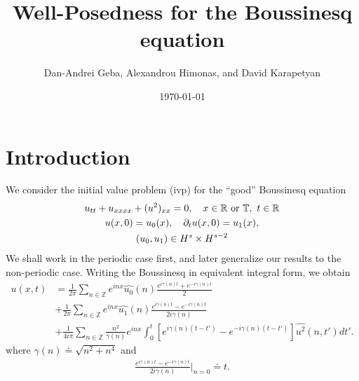 \documentclass[12pt,reqno]{amsart}
\numberwithin{equation}{section}  %
\newcommand{\rr}{\mathbb{R}}
\newcommand{\zz}{\mathbb{Z}}
\newcommand{\ci}{\mathbb{T}}
\newcommand{\wh}{\widehat}
\newcommand{\p}{\partial}
\begin{document}
\title{Well-Posedness for the Boussinesq equation}
\author{Dan-Andrei Geba, Alexandrou Himonas, and David Karapetyan}
\address{Department of Mathematics, University of Rochester, Rochester, NY 14627}
\address{Department of Mathematics, University of Notre Dame, Notre Dame, IN 46556}
\address{Department of Mathematics, University of Notre Dame, Notre Dame, IN 46556}
\date{\today}
%
%
\maketitle
\tableofcontents
%
%
\section{Introduction}
%
We consider the initial value problem (ivp) for the ``good'' Boussinesq
equation 
\begin{gather}
  u_{tt} + u_{xxxx} + (u^2)_{xx} = 0, \quad x \in \rr \ \text{or} \
  \ci, \ t \in \rr
  \label{eqn:mb-2}
  \\
  u(x,0) = u_{0}(x), \quad \p_t u(x, 0) = u_1(x), 
  \label{eqn:mb-init-data-2}
  \\
  \notag
  (u_0, u_1) \in
  H^{s}\times
  H^{s-2}
\end{gather}
%
%
We shall work in the periodic case first, and later generalize our results to
the non-periodic case. Writing the Boussinesq in equivalent integral form, we obtain 
%
\begin{equation}
  \begin{split}
    u(x,t)
    & = \frac{1}{2\pi}\sum_{n \in \zz} e^{inx} \wh{u_{0}}(n) \frac{e^{i\gamma(n)t} + e^{-i\gamma(n)t}}{2} 
    \\
    & + \frac{1}{2 \pi}\sum_{n \in \zz} e^{inx}
    \wh{u_{1}}(n)\frac{e^{i\gamma(n)t} - e^{-i\gamma(n)t}}{2 i \gamma(n)} 
    \\
    & + \frac{1}{4 i \pi}\sum_{n \in \zz} \frac{n^{2}}{\gamma(n)} e^{inx}
    \int_{0}^{t}[e^{i\gamma(n)(t-t')}-e^{-i\gamma(n)(t-t')}]
    \wh{u^{2}}(n, t') dt'.
  \end{split}
  \label{eqn:integral-form}
\end{equation}
%
%
where $\gamma(n) \doteq \sqrt{n^{2} + n^{4}}$ and
%
%
\begin{equation*}
\begin{split}
  \frac{e^{i\gamma(n)t} - e^{-i\gamma(n)t}}{2 i \gamma(n)} \vert_{n=0} \doteq t.
\end{split}
\end{equation*}
\end{document}
